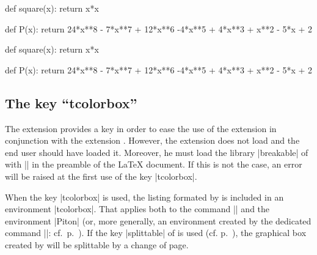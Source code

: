 \documentclass{article}
\begin{document}
\smallskip

\begin{Code}
\begin{center}
\begin{Piton}
def square(x):
    return x*x
\end{Piton}
\hspace{1cm}
\begin{Piton}
def P(x):
    return 24*x**8 - 7*x**7 + 12*x**6 -4*x**5 + 4*x**3 + x**2 - 5*x + 2
\end{Piton}
\end{center}
\end{Code}

\begin{center}
\begin{Piton}
def square(x):
    return x*x
\end{Piton}
\hspace{1cm}
\begin{Piton}
def P(x):
    return 24*x**8 - 7*x**7 + 12*x**6 -4*x**5 + 4*x**3 + x**2 - 5*x + 2
\end{Piton}
\end{center}

\subsection{The key ``tcolorbox''}

\label{tcolorbox}

The extension  provides a key  in order to
ease the use of the extension  in conjunction with the extension
. However, the extension  does not load  and
the end user should have loaded it. Moreover, he must load the library |breakable|
of  with || in the preamble of the LaTeX document.
If this is not the case, an error will be raised at the first use of the key
|tcolorbox|.

\bigskip
When the key |tcolorbox| is used, the listing formated by  is
included in an environment |{tcolorbox}|. That applies both to the command
|\PitonInputFile| and the environment |{Piton}| (or, more generally, an
environment created by the dedicated command |\NewPitonEnvironment|:
cf.~p.~\pageref{NewPitonEnvironment}). If the key |splittable| of 
is used (cf. p.~\pageref{page breaks}), the graphical box created by
 will be splittable by a change of page.
\end{document}
